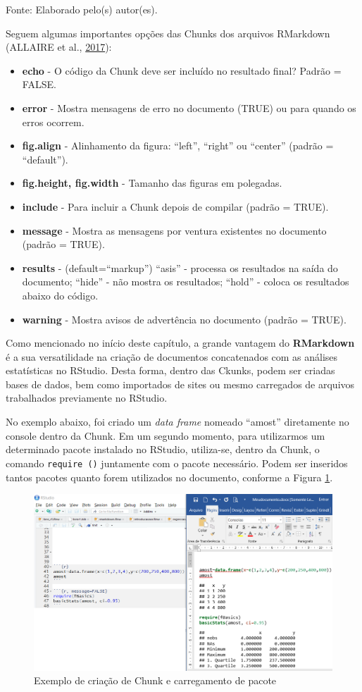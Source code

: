 \documentclass[12pt,brazil,oneside]{book}
\providecommand{\tightlist}{%
  \setlength{\itemsep}{0pt}\setlength{\parskip}{0pt}}
\begin{document}
Fonte: Elaborado pelo(s) autor(es).

Seguem algumas importantes opções das Chunks dos arquivos RMarkdown
(ALLAIRE et al., \protect\hyperlink{ref-R-rmarkdown}{2017}):

\begin{itemize}
\tightlist
\item
  \textbf{echo} - O código da Chunk deve ser incluído no resultado
  final? Padrão = FALSE.
\item
  \textbf{error} - Mostra mensagens de erro no documento (TRUE) ou para
  quando os erros ocorrem.
\item
  \textbf{fig.align} - Alinhamento da figura: ``left'', ``right'' ou
  ``center'' (padrão = ``default'').
\item
  \textbf{fig.height, fig.width} - Tamanho das figuras em polegadas.
\item
  \textbf{include} - Para incluir a Chunk depois de compilar (padrão =
  TRUE).
\item
  \textbf{message} - Mostra as mensagens por ventura existentes no
  documento (padrão = TRUE).
\item
  \textbf{results} - (default=``markup'') ``asis'' - processa os
  resultados na saída do documento; ``hide'' - não mostra os resultados;
  ``hold'' - coloca os resultados abaixo do código.
\item
  \textbf{warning} - Mostra avisos de advertência no documento (padrão =
  TRUE).
\end{itemize}

Como mencionado no início deste capítulo, a grande vantagem do
\textbf{RMarkdown} é a sua versatilidade na criação de documentos
concatenados com as análises estatísticas no RStudio. Desta forma,
dentro das Ckunks, podem ser criadas bases de dados, bem como importados
de sites ou mesmo carregados de arquivos trabalhados previamente no
RStudio.

No exemplo abaixo, foi criado um \emph{data frame} nomeado ``amost''
diretamente no console dentro da Chunk. Em um segundo momento, para
utilizarmos um determinado pacote instalado no RStudio, utiliza-se,
dentro da Chunk, o comando \texttt{require\ ()} juntamente com o pacote
necessário. Podem ser inseridos tantos pacotes quanto forem utilizados
no documento, conforme a Figura \ref{fig:rmarkchunk3}.

\begin{figure}[H]

{\centering \includegraphics[width=0.6\linewidth]{rmarkchunk3} 

}

\caption{Exemplo de criação de Chunk e carregamento de pacote}\label{fig:rmarkchunk3}
\end{figure}
\end{document}
